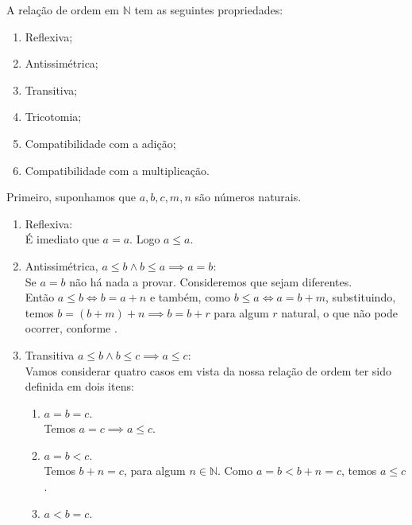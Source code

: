 \documentclass[../main.tex]{subfiles}
\begin{document}
\begin{teo}\label{nat-teo-relacaoOrdemPropriedades}
    A relação de ordem em $\mathbb{N}$ tem as seguintes propriedades:
    \begin{enumerate}[label=(\roman*)]
        \item Reflexiva;
        \item Antissimétrica;
        \item Transitiva;
        \item Tricotomia;
        \item Compatibilidade com a adição;
        \item Compatibilidade com a multiplicação.
    \end{enumerate}
\end{teo}
\begin{dem}
    Primeiro, suponhamos que $a,b,c,m,n$ são números naturais.
    \begin{enumerate}[label=(\roman*)]
        \item Reflexiva: \\
            É imediato que $a = a$. Logo $ a \leq a$.
        \item Antissimétrica, $a \leq b \land b \leq a \implies a=b$: \\
            Se $a=b$ não há nada a provar. Consideremos que sejam diferentes. \\
            Então $a \leq b \iff b = a + n$ e também, como $b \leq a \iff a = b + m$, substituindo, temos $b = (b+m) + n \implies b = b+r$ para algum $r$ natural, o que não pode ocorrer, conforme . %
        \item Transitiva $a \leq b \land b \leq c \implies a \leq c$: \\
            Vamos considerar quatro casos em vista da nossa relação de ordem ter sido definida em dois itens:
            \begin{enumerate}[label=(\arabic*)]
                \item $a = b = c$. \\
                    Temos $a = c \implies a \leq c$. 
                \item $a = b < c$. \\
                    Temos $b+n = c$, para algum $n \in \mathbb{N}$. Como $a=b < b+ n = c$, temos $a \leq c$.
                \item $a < b = c$. \\

\end{enumerate}
\end{enumerate}
\end{dem}
\end{document}
